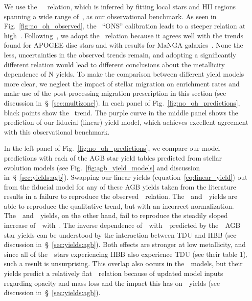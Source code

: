 \documentclass[ms.tex]{subfiles}
\begin{document}
We use the~\citet{Dopita2016}~\ohno~relation, which is inferred by fitting
local stars and HII regions spanning a wide range of~\oh, as our observational
benchmark.
As seen in Fig.~\ref{fig:no_oh_observed}, the~\citet{Pilyugin2010} ``ONS''
calibration leads to a steeper relation at high~\oh.
Following~\citet{Vincenzo2021}, we adopt the~\citet{Dopita2016} relation
because it agrees well with the trends found for APOGEE disc stars and with
results for MaNGA galaxies~\citep[][see
Fig.~\ref{fig:no_oh_observed}]{Belfiore2017}.
None the less, uncertainties in the observed trends remain, and adopting a
significantly different relation would lead to different conclusions about the
metallicity dependence of N yields.
To make the comparison between different yield models more clear, we neglect
the impact of stellar migration on enrichment rates and make use of the
post-processing migration prescription in this section (see discussion
in~\S~\ref{sec:multizone}).
In each panel of Fig.~\ref{fig:no_oh_predictions}, black points show
the~\citet{Dopita2016} trend.
The purple curve in the middle panel shows the prediction of our fiducial
(linear) yield model, which achieves excellent agreement with this
observational benchmark.
\par
In the left panel of Fig.~\ref{fig:no_oh_predictions}, we compare our model
predictions with each of the AGB star yield tables predicted from stellar
evolution models (see Fig.~\ref{fig:agb_yield_models} and discussion
in~\S~\ref{sec:yields:agb}).
Swapping our linear yields (equation~\ref{eq:linear_yield}) out from the
fiducial model for any of these AGB yields taken from the literature results
in a failure to reproduce the observed~\ohno~relation.
The~\cristallo~and~\ventura~yields are able to reproduce the qualitative trend,
but with an incorrect normalization.
The~\karakasten~and~\karakas~yields, on the other hand, fail to reproduce
the steadily sloped increase of~\no~with~\oh.
The inverse dependence of~\no~with~\oh~predicted by the~\karakasten~AGB star
yields can be understood by the interaction between TDU and HBB (see discussion
in~\S~\ref{sec:yields:agb}).
Both effects are stronger at low metallicity, and since all of
the~\karakasten~stars experiencing HBB also experience TDU (see their table 1),
such a result is unsurprising.
This overlap also occurs in the~\karakas~models, but their yields predict a
relatively flat~\ohno~relation because of updated model inputs regarding
opacity and mass loss and the impact this has on~\Nfourteen~yields (see
discussion in~\S~\ref{sec:yields:agb}).
\end{document}
